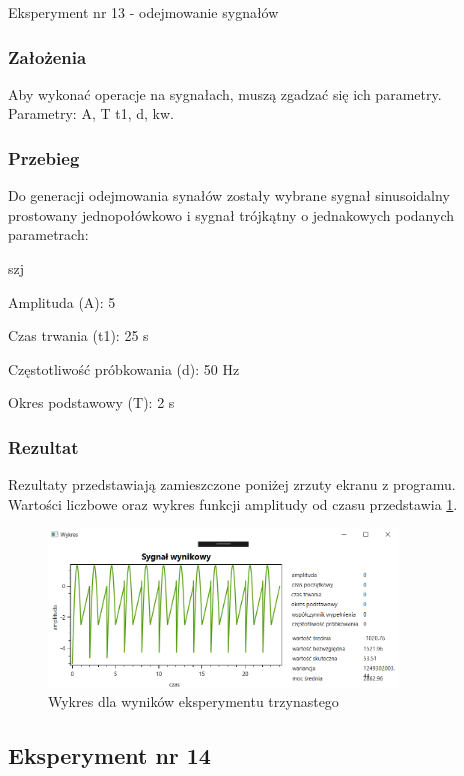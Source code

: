 \documentclass[12pt]{article}
\begin{document}
Eksperyment nr 13 - odejmowanie sygnałów

\subsubsection{Założenia}
Aby wykonać operacje na sygnałach, muszą zgadzać się ich parametry.
\\
Parametry: A, T t1, d, kw.

\subsubsection{Przebieg}
Do generacji odejmowania synałów zostały wybrane sygnał sinusoidalny prostowany jednopołówkowo i sygnał trójkątny o jednakowych podanych parametrach:

\begin{labeling}{szj}
\item [Amplituda (A):] 5
\item [Czas trwania (t1):] 25 s
\item [Częstotliwość próbkowania (d): ] 50 Hz
\item [Okres podstawowy (T):] 2 s
\end{labeling}

\subsubsection{Rezultat}
Rezultaty przedstawiają zamieszczone poniżej zrzuty ekranu z programu. Wartości liczbowe oraz wykres funkcji amplitudy od czasu przedstawia \ref{Wykres dla wyników eksperymentu trzynastego}.
\begin{figure}[h!]
 \centering
 \includegraphics[width=9.3cm]{MinSinJedPTrojA5t125d50T2.png}
 \vspace{-0.3cm}
 \caption{Wykres dla wyników eksperymentu trzynastego}
 \label{Wykres dla wyników eksperymentu trzynastego}
\end{figure}

\subsection{Eksperyment nr 14}
\end{document}
